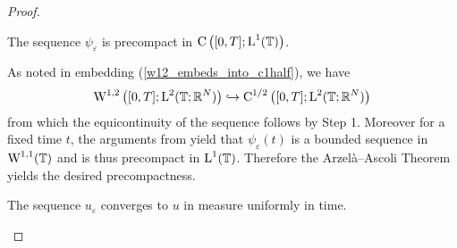 \begin{proof}
\begin{description}[wide=0pt]
		\item[Step 2:] The sequence $ \psi_{ \varepsilon } $ is precompact in $ \operatorname{C} \left( [ 0 , T ] ; \operatorname{L}^{ 1 } ( \operatorname{\mathbb{T}} ) \right) $.
		
		As noted in embedding (\ref{w12_embeds_into_c1half}), we have
		\begin{equation*}
			\operatorname{W}^{ 1 , 2 } \left( [ 0 , T ] ; \operatorname{L}^{ 2 } ( \operatorname{\mathbb{T}} ; \mathbb{ R }^{ N } ) \right)
			\hookrightarrow
			\operatorname{C}^{ 1 / 2 } \left( [ 0 , T ] ; \operatorname{L}^{ 2 } ( \operatorname{\mathbb{T}} ; \mathbb{ R }^{ N } ) \right)
		\end{equation*}
		from which the equicontinuity of the sequence follows by Step 1.
		Moreover for a fixed time $ t $, the arguments from 
		 yield that $ \psi_{ \varepsilon } ( t 
		) $ is a bounded sequence in $ \operatorname{W}^{ 1 , 1 } ( \operatorname{\mathbb{T}} ) $ and is 
		thus precompact in $ \operatorname{L}^{ 1 } ( \operatorname{\mathbb{T}} ) $.
		Therefore the Arzelà--Ascoli Theorem yields the desired precompactness.
		
		\item[Step 3:] The sequence $ u_{ \varepsilon } $ converges to $ u $ in measure uniformly in time.
		

\end{description}
\end{proof}
